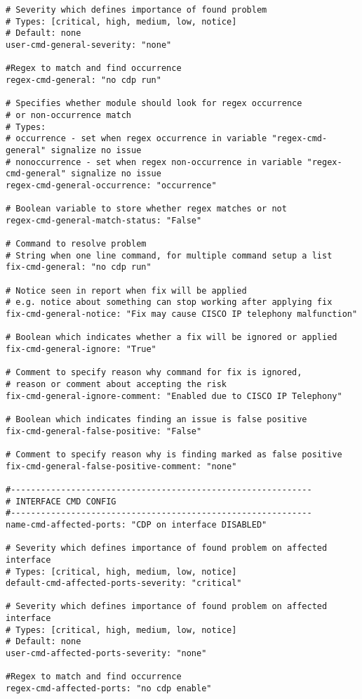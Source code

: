 \begin{lstlisting}
# Severity which defines importance of found problem 
# Types: [critical, high, medium, low, notice]
# Default: none
user-cmd-general-severity: "none"

#Regex to match and find occurrence
regex-cmd-general: "no cdp run"

# Specifies whether module should look for regex occurrence
# or non-occurrence match
# Types:
# occurrence - set when regex occurrence in variable "regex-cmd-general" signalize no issue
# nonoccurrence - set when regex non-occurrence in variable "regex-cmd-general" signalize no issue
regex-cmd-general-occurrence: "occurrence"

# Boolean variable to store whether regex matches or not 
regex-cmd-general-match-status: "False"

# Command to resolve problem
# String when one line command, for multiple command setup a list
fix-cmd-general: "no cdp run"

# Notice seen in report when fix will be applied
# e.g. notice about something can stop working after applying fix
fix-cmd-general-notice: "Fix may cause CISCO IP telephony malfunction"

# Boolean which indicates whether a fix will be ignored or applied
fix-cmd-general-ignore: "True"

# Comment to specify reason why command for fix is ignored,
# reason or comment about accepting the risk
fix-cmd-general-ignore-comment: "Enabled due to CISCO IP Telephony"

# Boolean which indicates finding an issue is false positive
fix-cmd-general-false-positive: "False"

# Comment to specify reason why is finding marked as false positive
fix-cmd-general-false-positive-comment: "none"

#------------------------------------------------------------
# INTERFACE CMD CONFIG
#------------------------------------------------------------
name-cmd-affected-ports: "CDP on interface DISABLED"

# Severity which defines importance of found problem on affected interface
# Types: [critical, high, medium, low, notice]
default-cmd-affected-ports-severity: "critical"

# Severity which defines importance of found problem on affected interface
# Types: [critical, high, medium, low, notice]
# Default: none
user-cmd-affected-ports-severity: "none"

#Regex to match and find occurrence
regex-cmd-affected-ports: "no cdp enable"


\end{lstlisting}
